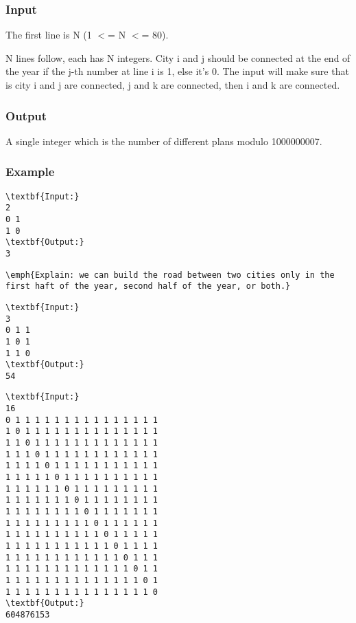 \subsubsection{   Input  }

   The first line is N (1 $<$= N $<$= 80).  

   N lines follow, each has N integers. City i and j should be connected at the end of the year if the j-th number at line i is 1, else it's 0. The input will make sure that is city i and j are connected, j and k are connected, then i and k are connected.  

\subsubsection{   Output  }

   A single integer which is the number of different plans modulo 1000000007.  

\subsubsection{   Example  }
\begin{verbatim}
\textbf{Input:}
2
0 1
1 0
\textbf{Output:}
3\end{verbatim}
\begin{verbatim}
\emph{Explain: we can build the road between two cities only in the first haft of the year, second half of the year, or both.}\end{verbatim}
\begin{verbatim}
\textbf{Input:}
3
0 1 1
1 0 1
1 1 0
\textbf{Output:}
54
\end{verbatim}
\begin{verbatim}
\textbf{Input:}
16
0 1 1 1 1 1 1 1 1 1 1 1 1 1 1 1
1 0 1 1 1 1 1 1 1 1 1 1 1 1 1 1
1 1 0 1 1 1 1 1 1 1 1 1 1 1 1 1
1 1 1 0 1 1 1 1 1 1 1 1 1 1 1 1
1 1 1 1 0 1 1 1 1 1 1 1 1 1 1 1
1 1 1 1 1 0 1 1 1 1 1 1 1 1 1 1
1 1 1 1 1 1 0 1 1 1 1 1 1 1 1 1
1 1 1 1 1 1 1 0 1 1 1 1 1 1 1 1
1 1 1 1 1 1 1 1 0 1 1 1 1 1 1 1
1 1 1 1 1 1 1 1 1 0 1 1 1 1 1 1
1 1 1 1 1 1 1 1 1 1 0 1 1 1 1 1
1 1 1 1 1 1 1 1 1 1 1 0 1 1 1 1
1 1 1 1 1 1 1 1 1 1 1 1 0 1 1 1
1 1 1 1 1 1 1 1 1 1 1 1 1 0 1 1
1 1 1 1 1 1 1 1 1 1 1 1 1 1 0 1
1 1 1 1 1 1 1 1 1 1 1 1 1 1 1 0
\textbf{Output:}
604876153\end{verbatim}